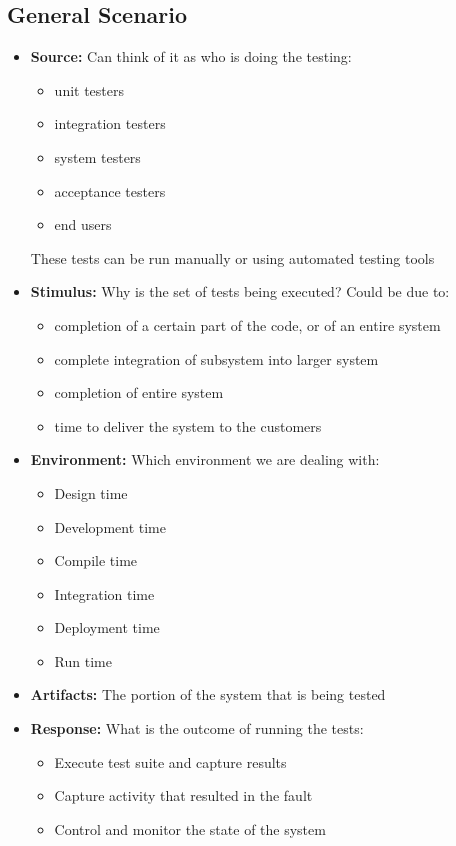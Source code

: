 \documentclass[a4paper]{article}
\begin{document}
\subsection{General Scenario}
\begin{itemize}
\item   
   \textbf{Source:}
   Can think of it as who is doing the testing:
   \begin{itemize}
   \item unit testers
   \item integration testers
   \item system testers
   \item acceptance testers
   \item end users
   \end{itemize}
   These tests can be run manually or using automated testing tools
   
\item 
   \textbf{Stimulus:} 
   Why is the set of tests being executed? 
   Could be due to:
   \begin{itemize}
   \item completion of a certain part of the code, or of an entire system
   \item complete integration of subsystem into larger system
   \item completion of entire system
   \item time to deliver the system to the customers
   \end{itemize}
   
    
\item 
   \textbf{Environment:}
   Which environment we are dealing with:
   \begin{itemize}
   \item Design time
   \item Development time
   \item Compile time
   \item Integration time
   \item Deployment time
   \item Run time
   \end{itemize}  

\item
   \textbf{Artifacts:}
   The portion of the system that is being tested

\item 
   \textbf{Response:}
   What is the outcome of running the tests:
   \begin{itemize}
   \item Execute test suite and capture results
   \item Capture activity that resulted in the fault
   \item Control and monitor the state of the system
   \end{itemize} 


\end{itemize}
\end{document}
